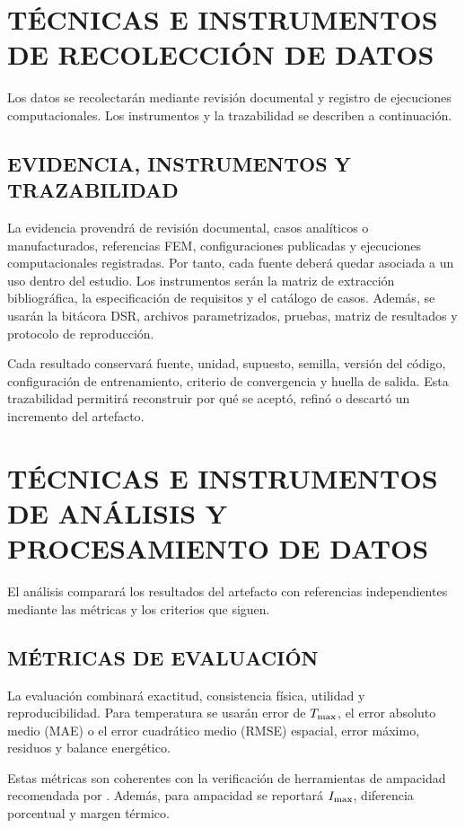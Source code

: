 \section{TÉCNICAS E INSTRUMENTOS DE RECOLECCIÓN DE DATOS}

Los datos se recolectarán mediante revisión documental y registro de ejecuciones computacionales. Los instrumentos y la trazabilidad se describen a continuación.

\subsection{EVIDENCIA, INSTRUMENTOS Y TRAZABILIDAD}

La evidencia provendrá de revisión documental, casos analíticos o manufacturados, referencias FEM, configuraciones publicadas y ejecuciones computacionales registradas. Por tanto, cada fuente deberá quedar asociada a un uso dentro del estudio. Los instrumentos serán la matriz de extracción bibliográfica, la especificación de requisitos y el catálogo de casos. Además, se usarán la bitácora DSR, archivos parametrizados, pruebas, matriz de resultados y protocolo de reproducción.

Cada resultado conservará fuente, unidad, supuesto, semilla, versión del código, configuración de entrenamiento, criterio de convergencia y huella de salida. Esta trazabilidad permitirá reconstruir por qué se aceptó, refinó o descartó un incremento del artefacto.

\section{TÉCNICAS E INSTRUMENTOS DE ANÁLISIS Y PROCESAMIENTO DE DATOS}

El análisis comparará los resultados del artefacto con referencias independientes mediante las métricas y los criterios que siguen.

\subsection{MÉTRICAS DE EVALUACIÓN}

La evaluación combinará exactitud, consistencia física, utilidad y reproducibilidad. Para temperatura se usarán error de $T_{\max}$, el error absoluto medio (MAE) o el error cuadrático medio (RMSE) espacial, error máximo, residuos y balance energético.

Estas métricas son coherentes con la verificación de herramientas de ampacidad recomendada por \textcite[93--99]{cigre2025}. Además, para ampacidad se reportará $I_{\max}$, diferencia porcentual y margen térmico.


